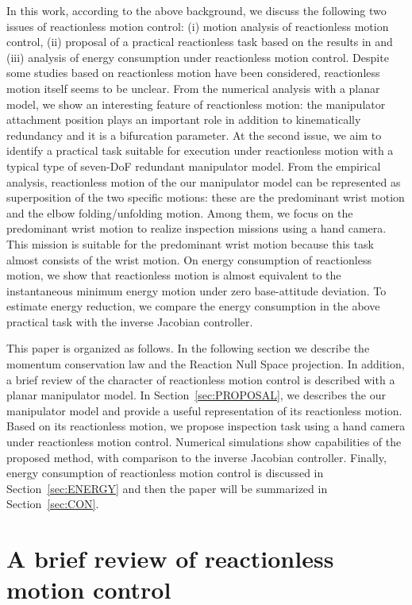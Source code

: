 \documentclass[preprint,12pt]{elsarticle}
\def\sec#1{{Section~\ref{sec:#1}}}
\begin{document}
In this work,
according to the above background,
we discuss the following two issues of reactionless motion control:
(i) motion analysis of reactionless motion control,
(ii) proposal of a practical reactionless task based on the results in \cite{Sone2015} and
(iii) analysis of energy consumption under reactionless motion control.
Despite some studies based on reactionless motion have been considered,
reactionless motion itself seems to be unclear.
From the numerical analysis with a planar model,
we show an interesting feature of reactionless motion:
the manipulator attachment position plays an important role in addition to kinematically redundancy
and it is a bifurcation parameter.
At the second issue,
we aim to identify a practical task suitable for execution under reactionless motion
with a typical type of seven-DoF redundant manipulator model.
From the empirical analysis,
reactionless motion of the our manipulator model can be represented as superposition of the
two specific motions: these are the predominant wrist motion and the elbow folding/unfolding motion.
Among them, we focus on the predominant wrist motion to realize inspection missions using a hand camera.
This mission is suitable for the predominant wrist motion because this task almost consists of the wrist motion.
On energy consumption of reactionless motion,
we show that reactionless motion is almost equivalent to
the instantaneous minimum energy motion under zero base-attitude deviation.
To estimate energy reduction, we compare the energy consumption
in the above practical task with the inverse Jacobian controller.

This paper is organized as follows.
In the following section we describe the momentum conservation law and
the Reaction Null Space projection.
In addition,
a brief review of the character of reactionless motion control is described
with a planar manipulator model.
In \sec{PROPOSAL}, we describes the our manipulator model and
provide a useful representation of its reactionless motion.
Based on its reactionless motion,
we propose inspection task using a hand camera under reactionless motion control.
Numerical simulations show capabilities of the proposed method,
with comparison to the inverse Jacobian controller.
Finally,
energy consumption of reactionless motion control is discussed in \sec{ENERGY} and
then the paper will be summarized in \sec{CON}.


\section{A brief review of reactionless motion control}
\label{sec:BASIC}
\end{document}
